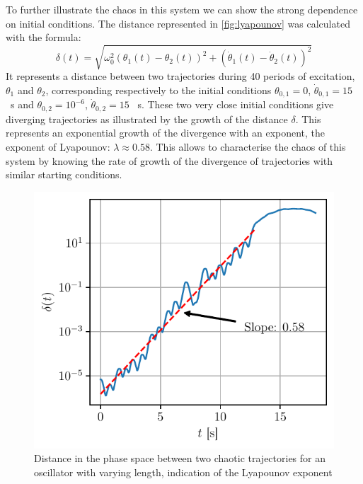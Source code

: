 To further illustrate the chaos in this system we can show the strong dependence on initial conditions. The distance represented in \autoref{fig:lyapounov} was calculated with the formula:
\begin{equation}
    \delta(t) = \sqrt{\omega_0^2(\theta_1(t) - \theta_2(t))^2 + (\dot\theta_1(t) - \dot\theta_2(t))^2}
\end{equation}
It represents a distance between two trajectories during 40 periods of excitation, $\theta_1$ and $\theta_2$, corresponding respectively to the initial conditions $\theta_{0,1} = 0$, $\dot\theta_{0,1} = 15$ \si{\per\second} and $\theta_{0,2} = 10^{-6}$, $\dot\theta_{0,2} = 15$ \si{\per\second}. These two very close initial conditions give diverging trajectories as illustrated by the growth of the distance $\delta$. This represents an exponential growth of the divergence with an exponent, the exponent of Lyapounov: $\lambda \approx 0.58$. This allows to characterise the chaos of this system by knowing the rate of growth of the divergence of trajectories with similar starting conditions.

\begin{figure}[H]
    \centering
    \includegraphics[width=0.6\linewidth]{figures/lyapounov.pdf}
    \caption{Distance in the phase space between two chaotic trajectories for an oscillator with varying length, indication of the Lyapounov exponent}
    \label{fig:lyapounov}
\end{figure}



